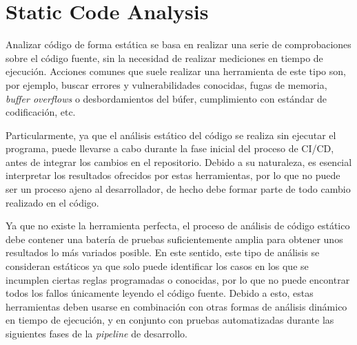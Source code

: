 \section{Static Code Analysis}

Analizar código de forma estática se basa en realizar una serie de comprobaciones sobre el código fuente, sin la necesidad de realizar mediciones en tiempo de ejecución. Acciones comunes que suele realizar una herramienta de este tipo son, por ejemplo, buscar errores y vulnerabilidades conocidas, fugas de memoria, \textit{buffer overflows} o desbordamientos del búfer, cumplimiento con estándar de codificación, etc.

\vspace{10px}

Particularmente, ya que el análisis estático del código se realiza sin ejecutar el programa, puede llevarse a cabo durante la fase inicial del proceso de CI/CD, antes de integrar los cambios en el repositorio. Debido a su naturaleza, es esencial interpretar los resultados ofrecidos por estas herramientas, por lo que no puede ser un proceso ajeno al desarrollador, de hecho debe formar parte de todo cambio realizado en el código.

\vspace{10px}

Ya que no existe la herramienta perfecta, el proceso de análisis de código estático debe contener una batería de pruebas suficientemente amplia para obtener unos resultados lo más variados posible. En este sentido, este tipo de análisis se consideran estáticos ya que solo puede identificar los casos en los que se incumplen ciertas reglas programadas o conocidas, por lo que no puede encontrar todos los fallos únicamente leyendo el código fuente. Debido a esto, estas herramientas deben usarse en combinación con otras formas de análisis dinámico en tiempo de ejecución, y en conjunto con pruebas automatizadas durante las siguientes fases de la \textit{pipeline} de desarrollo.

\pagebreak
